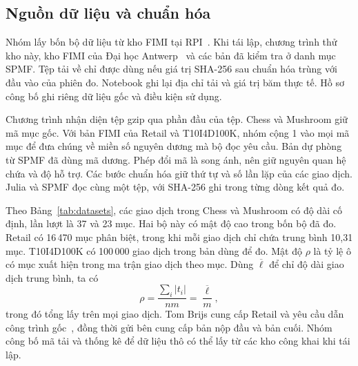 \begin{table}[tb]
\centering
\caption{Sáu ngưỡng hỗ trợ tối thiểu của từng bộ dữ liệu, từ cao xuống thấp. Nguồn cấu hình là \texttt{configs/experiments.toml}.}
\label{tab:thresholds}
\TableThresholds
\end{table}

\subsection{Nguồn dữ liệu và chuẩn hóa}
Nhóm lấy bốn bộ dữ liệu từ kho FIMI tại RPI~\cite{fimi}.
Khi tái lập, chương trình thử kho này, kho FIMI của Đại học
Antwerp~\cite{fimiantwerp} và các bản đã kiểm tra ở danh mục SPMF.
Tệp tải về chỉ được dùng nếu giá trị SHA-256 sau chuẩn hóa trùng với
đầu vào của phiên đo. Notebook ghi lại địa chỉ tải và giá trị băm
thực tế. Hồ sơ công bố ghi riêng dữ liệu gốc và điều kiện sử dụng.

Chương trình nhận diện tệp gzip qua phần đầu của tệp. Chess và
Mushroom giữ mã mục gốc. Với bản FIMI của Retail và T10I4D100K, nhóm
cộng 1 vào mọi mã mục để đưa chúng về miền số nguyên dương mà bộ đọc
yêu cầu. Bản dự phòng từ SPMF đã dùng mã dương. Phép đổi mã là song
ánh, nên giữ nguyên quan hệ chứa và độ hỗ trợ. Các bước chuẩn hóa
giữ thứ tự và số lần lặp của các giao dịch. Julia và SPMF đọc cùng
một tệp, với SHA-256 ghi trong từng dòng kết quả đo.

\begin{table}[tb]
\centering
\caption{Thống kê dữ liệu sau chuẩn hóa. $n$ là số giao dịch, $m$ là số mục phân biệt. Độ dài giao dịch tính bằng số mục trong một hàng. Nguồn số liệu là \texttt{results/raw/dataset\_statistics.csv}.}
\label{tab:datasets}
\TableDatasets
\end{table}

Theo Bảng~\ref{tab:datasets}, các giao dịch trong Chess và Mushroom có
độ dài cố định, lần lượt là 37 và 23 mục. Hai bộ này có mật độ cao
trong bốn bộ đã đo. Retail có 16\,470 mục phân biệt, trong khi mỗi
giao dịch chỉ chứa trung bình 10,31 mục. T10I4D100K có 100\,000 giao
dịch trong bản dùng để đo. Mật độ $\rho$ là tỷ lệ ô có mục xuất hiện
trong ma trận giao dịch theo mục. Dùng $\overline{\ell}$ để chỉ độ
dài giao dịch trung bình, ta có
\begin{equation}
 \rho=\frac{\sum_i |t_i|}{nm}=\frac{\overline{\ell}}{m},
 \label{eq:density}
\end{equation}
trong đó tổng lấy trên mọi giao dịch. Tom Brijs cung cấp Retail và
yêu cầu dẫn công trình gốc~\cite{brijs1999}, đồng thời gửi bên cung
cấp bản nộp đầu và bản cuối. Nhóm công bố mã tải và thống kê để dữ
liệu thô có thể lấy từ các kho công khai khi tái lập.


